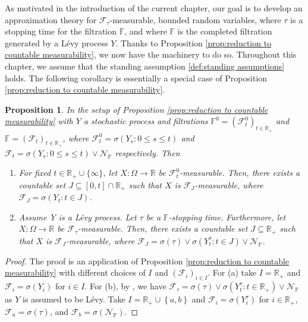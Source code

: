 \documentclass[11pt,a4paper,twoside,openany]{report}
\numberwithin{equation}{section}
\theoremstyle{plain} %
\newtheorem{proposition}[theorem]{Proposition}
\theoremstyle{definition} %
\theoremstyle{remark} %
\let\parencite\authnumparencite
\begin{document}
As motivated in the introduction of the current chapter, our goal is to develop an approximation theory for \(\mathcal{F_{\tau}}\)-measurable, bounded random variables, where \(\tau\) is a stopping time for the filtration \(\mathbb{F}\), and where \(\mathbb{F}\) is the completed filtration generated by a Lévy process \(Y\).
Thanks to Proposition \ref{prop:reduction to countable measurability}, we now have the machinery to do so. Throughout this chapter, we assume that the standing assumption \ref{def:standing assumptions} holds. The following corollary is essentially a special case of Proposition \ref{prop:reduction to countable measurability}. 
\begin{proposition}\label{prop:reduction to countable measurability with filtration}
    In the setup of Proposition \ref{prop:reduction to countable measurability} with \(Y\) a stochastic process and filtrations \(\mathbb{F}^0=(\mathcal{F}^0_t)_{t\in\mathbb{R}_+}\) and \(\mathbb{F}=(\mathcal{F}_t)_{t\in\mathbb{R}_+}\), where \(\mathcal{F}^0_t=\sigma(Y_s:0\leq s\leq t)\) and \(\mathcal{F}_t=\sigma(Y_s:0\leq s\leq t)\vee\mathcal{N}_{\mathbb{P}}\) respectively. Then
    \begin{enumerate}[label=(\alph*)]
        \item For fixed \(t\in\mathbb{R}_+\cup\{\infty\}\), let \(X:\Omega\to\mathbb{R}\) be \(\mathcal{F}^0_t\)-measurable. Then, there exists a \textit{countable} set \(J\subseteq [0,t]\cap\mathbb{R}_+\) such that \(X\) is \(\mathcal{F}_J\)-measurable, where \(\mathcal{F}_J = \sigma(Y_t:t\in J)\). 
        \item Assume Y is a Lévy process. Let \(\tau\) be a \(\mathbb{F}\)-stopping time. Furthermore, let \(X:\Omega\to\mathbb{R}\) be \(\mathcal{F}_{\tau}\)-measurable. Then, there exists a countable set \(J\subseteq\mathbb{R}_+\) such that \(X\) is \(\mathcal{F}_J\)-measurable, where \(\mathcal{F}_J=\sigma(\tau)\vee\sigma(Y_t^{\tau}:t\in J)\vee \mathcal{N}_{\mathbb{P}}\).
    \end{enumerate}
\end{proposition}
\begin{proof}
    The proof is an application of Proposition \ref{prop:reduction to countable measurability} with different choices of \(I\) and \((\mathcal{F}_i)_{i\in I}\). For (a) take \(I=\mathbb{R}_+\) and \(\mathcal{F}_i=\sigma(Y_i)\) for \(i\in I\). For (b), by \parencite[Thm.~13.45]{HeWangYan1992}, we have \(\mathcal{F}_{\tau}=\sigma(\tau)\vee\sigma(Y_t^{\tau}:t\in \mathbb{R}_+)\vee \mathcal{N}_{\mathbb{P}}\) as \(Y\) is assumed to be Lévy. Take \(I=\mathbb{R}_+\cup\left\{a,b\right\}\) and \(\mathcal{F}_i=\sigma(Y_i^{\tau})\) for \(i\in \mathbb{R}_+\), \(\mathcal{F}_a=\sigma(\tau)\), and \(\mathcal{F}_b=\sigma(\mathcal{N}_{\mathbb{P}})\). 
\end{proof}
\end{document}
